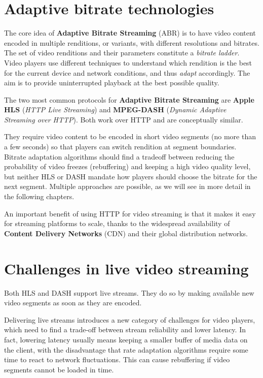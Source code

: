 \section{Adaptive bitrate technologies}
\label{sec:intro/technologies}

The core idea of \textbf{Adaptive Bitrate Streaming} (ABR) is to have video content encoded in multiple renditions, or variants, with different resolutions and bitrates. The set of video renditions and their parameters constitute a \textit{bitrate ladder}. Video players use different techniques to understand which rendition is the best for the current device and network conditions, and thus \textit{adapt} accordingly. The aim is to provide uninterrupted playback at the best possible quality.

The two most common protocols for \textbf{Adaptive Bitrate Streaming} are \textbf{Apple HLS} (\textit{HTTP Live Streaming}) and \textbf{MPEG-DASH} (\textit{Dynamic Adaptive Streaming over HTTP}). Both work over HTTP and are conceptually similar.

They require video content to be encoded in short video segments (no more than a few seconds) so that players can switch rendition at segment boundaries. Bitrate adaptation algorithms should find a tradeoff between reducing the probability of video freezes (rebuffering) and keeping a high video quality level, but neither HLS or DASH mandate how players should choose the bitrate for the next segment. Multiple approaches are possible, as we will see in more detail in the following chapters.

An important benefit of using HTTP for video streaming is that it makes it easy for streaming platforms to scale, thanks to the widespread availability of \textbf{Content Delivery Networks} (CDN) and their global distribution networks.

\section{Challenges in live video streaming}
\label{sec:intro/challenges}

Both HLS and DASH support live streams. They do so by making available new video segments as soon as they are encoded.

Delivering live streams introduces a new category of challenges for video players, which need to find a trade-off between stream reliability and lower latency. In fact, lowering latency usually means keeping a smaller buffer of media data on the client, with the disadvantage that rate adaptation algorithms require some time to react to network fluctuations. This can cause rebuffering if video segments cannot be loaded in time.

